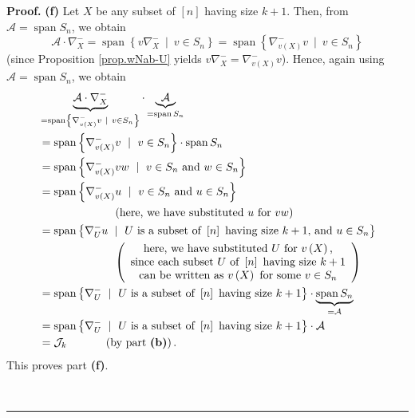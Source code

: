 \documentclass[numbers=enddot,12pt,final,onecolumn,notitlepage]{scrartcl}%
\numberwithin{exer}{subsection}
\theoremstyle{definition}
\newenvironment{proof}[1][Proof]{\noindent\textbf{#1.} }{\ \rule{0.5em}{0.5em}}
\begin{document}
\begin{proof}
\textbf{(f)} Let $X$ be any subset of $\left[  n\right]  $ having size $k+1$.
Then, from $\mathcal{A}=\operatorname*{span}S_{n}$, we obtain%
\[
\mathcal{A}\cdot\nabla_{X}^{-}=\operatorname*{span}\left\{  v\nabla_{X}%
^{-}\ \mid\ v\in S_{n}\right\}  =\operatorname*{span}\left\{  \nabla_{v\left(
X\right)  }^{-}v\ \mid\ v\in S_{n}\right\}
\]
(since Proposition \ref{prop.wNab-U} yields $v\nabla_{X}^{-}=\nabla_{v\left(
X\right)  }^{-}v$). Hence, again using $\mathcal{A}=\operatorname*{span}S_{n}%
$, we obtain
\begin{align*}
&  \underbrace{\mathcal{A}\cdot\nabla_{X}^{-}}_{=\operatorname*{span}\left\{
\nabla_{v\left(  X\right)  }^{-}v\ \mid\ v\in S_{n}\right\}  }\cdot
\underbrace{\mathcal{A}}_{=\operatorname*{span}S_{n}}\\
&  =\operatorname*{span}\left\{  \nabla_{v\left(  X\right)  }^{-}v\ \mid\ v\in
S_{n}\right\}  \cdot\operatorname*{span}S_{n}\\
&  =\operatorname*{span}\left\{  \nabla_{v\left(  X\right)  }^{-}%
vw\ \mid\ v\in S_{n}\text{ and }w\in S_{n}\right\} \\
&  =\operatorname*{span}\left\{  \nabla_{v\left(  X\right)  }^{-}u\ \mid\ v\in
S_{n}\text{ and }u\in S_{n}\right\} \\
&  \ \ \ \ \ \ \ \ \ \ \ \ \ \ \ \ \ \ \ \ \left(  \text{here, we have
substituted }u\text{ for }vw\right) \\
&  =\operatorname*{span}\left\{  \nabla_{U}^{-}u\ \mid\ U\text{ is a subset of
}\left[  n\right]  \text{ having size }k+1\text{, and }u\in S_{n}\right\} \\
&  \ \ \ \ \ \ \ \ \ \ \ \ \ \ \ \ \ \ \ \ \left(
\begin{array}
[c]{c}%
\text{here, we have substituted }U\text{ for }v\left(  X\right)  \text{,}\\
\text{since each subset }U\text{ of }\left[  n\right]  \text{ having size
}k+1\\
\text{can be written as }v\left(  X\right)  \text{ for some }v\in S_{n}%
\end{array}
\right) \\
&  =\operatorname*{span}\left\{  \nabla_{U}^{-}\ \mid\ U\text{ is a subset of
}\left[  n\right]  \text{ having size }k+1\right\}  \cdot
\underbrace{\operatorname*{span}S_{n}}_{=\mathcal{A}}\\
&  =\operatorname*{span}\left\{  \nabla_{U}^{-}\ \mid\ U\text{ is a subset of
}\left[  n\right]  \text{ having size }k+1\right\}  \cdot\mathcal{A}\\
&  =\mathcal{J}_{k}\ \ \ \ \ \ \ \ \ \ \left(  \text{by part \textbf{(b)}%
}\right)  .
\end{align*}
This proves part \textbf{(f)}. \medskip


\end{proof}
\end{document}
